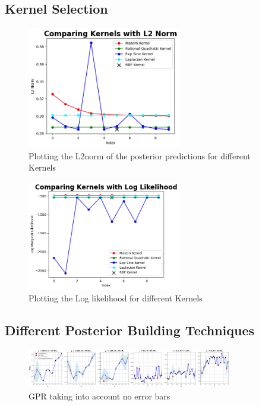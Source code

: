 \documentclass{article}
\begin{document}
\subsection{Kernel Selection}

\begin{figure}[H]  %
    \centering
    \includegraphics[width=0.6\textwidth]{GoodPlots/KernelL2norms.png}  %
    \caption{Plotting the L2norm of the posterior predictions for different Kernels}
    \label{fig:my_graph}
\end{figure}

\begin{figure}[H]  %
    \centering
    \includegraphics[width=0.6\textwidth]{GoodPlots/LogLikeKernels.png}  %
    \caption{Plotting the Log likelihood for different Kernels}
    \label{fig:my_graph}
\end{figure}


\subsection{Different Posterior Building Techniques}

\begin{figure}[H]  %
    \centering
    \includegraphics[width=0.8\textwidth]{GoodPlots/No Error.png}  %
    \caption{GPR taking into account no error bars}
    \label{fig:my_graph}
\end{figure}
\end{document}
